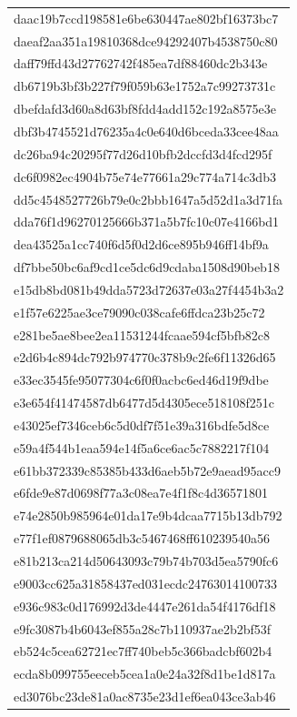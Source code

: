 \begin{tabular}{l}
daac19b7ccd198581e6be630447ae802bf16373bc7 \\
daeaf2aa351a19810368dce94292407b4538750c80 \\
daff79ffd43d27762742f485ea7df88460dc2b343e \\
db6719b3bf3b227f79f059b63e1752a7c99273731c \\
dbefdafd3d60a8d63bf8fdd4add152c192a8575e3e \\
dbf3b4745521d76235a4c0e640d6bceda33cee48aa \\
dc26ba94c20295f77d26d10bfb2dccfd3d4fcd295f \\
dc6f0982ec4904b75e74e77661a29c774a714c3db3 \\
dd5c4548527726b79e0c2bbb1647a5d52d1a3d71fa \\
dda76f1d96270125666b371a5b7fc10c07e4166bd1 \\
dea43525a1cc740f6d5f0d2d6ce895b946ff14bf9a \\
df7bbe50bc6af9cd1ce5dc6d9cdaba1508d90beb18 \\
e15db8bd081b49dda5723d72637e03a27f4454b3a2 \\
e1f57e6225ae3ce79090c038cafe6ffdca23b25c72 \\
e281be5ae8bee2ea11531244fcaae594cf5bfb82c8 \\
e2d6b4c894dc792b974770c378b9c2fe6f11326d65 \\
e33ec3545fe95077304c6f0f0acbc6ed46d19f9dbe \\
e3e654f41474587db6477d5d4305ece518108f251c \\
e43025ef7346ceb6c5d0df7f51e39a316bdfe5d8ce \\
e59a4f544b1eaa594e14f5a6ce6ac5c7882217f104 \\
e61bb372339c85385b433d6aeb5b72e9aead95acc9 \\
e6fde9e87d0698f77a3c08ea7e4f1f8c4d36571801 \\
e74e2850b985964e01da17e9b4dcaa7715b13db792 \\
e77f1ef0879688065db3c5467468ff610239540a56 \\
e81b213ca214d50643093c79b74b703d5ea5790fc6 \\
e9003cc625a31858437ed031ecdc24763014100733 \\
e936c983c0d176992d3de4447e261da54f4176df18 \\
e9fc3087b4b6043ef855a28c7b110937ae2b2bf53f \\
eb524c5cea62721ec7ff740beb5c366badcbf602b4 \\
ecda8b099755eeceb5cea1a0e24a32f8d1be1d817a \\
ed3076bc23de81a0ac8735e23d1ef6ea043ce3ab46 \\

\end{tabular}
